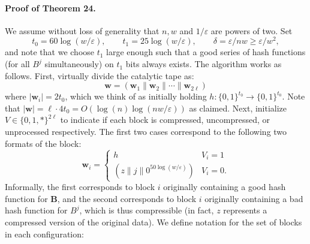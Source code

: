 \paragraph{Proof of Theorem 24.} We assume without loss of generality that $n,w$ and $1/\varepsilon$ are powers of two. Set
\[t_0=60\log(w/\varepsilon),\qquad t_1=25\log(w/\varepsilon),\qquad\delta=\varepsilon/nw\geq\varepsilon/w^2,\]
and note that we choose $t_1$ large enough such that a good series of hash functions (for all $B^j$ simultaneously) on $t_1$ bits always exists. The algorithm works as follows. First, virtually divide the catalytic tape as:
\[\mathbf w=(\mathbf w_1\|\mathbf w_2\|\cdots\|\mathbf w_{2\ell})\]
where $|\mathbf w_i|=2t_0$, which we think of as initially holding $h:\{0,1\}^{t_0}\to\{0,1\}^{t_0}$. Note that $|\mathbf w|=\ell\cdot4t_0=O(\log(n)\log(nw/\varepsilon))$ as claimed.
Next, initialize $V\in\{0,1,*\}^{2\ell}$ to indicate if each block is compressed, uncompressed, or unprocessed respectively. The first two cases correspond to the following two formats of the block:
\[\mathbf w_i=\begin{cases}h&V_i=1\\(z\|j\|0^{50\log(w/\varepsilon)})&V_i=0.\end{cases}\]
Informally, the first corresponds to block $i$ originally containing a good hash function for $\mathbf B$, and the second corresponds to block $i$ originally containing a bad hash function for $B^j$, which is thus compressible (in fact, $z$ represents a compressed version of the original data). We define notation for the set of blocks in each configuration:
